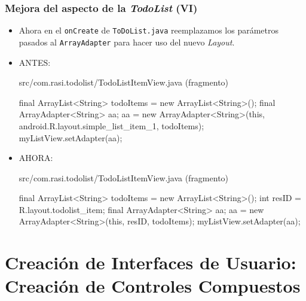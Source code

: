 \documentclass[hyperref={pdfpagelabels=true},ucs]{beamer}
\begin{document}
\begin{frame}[fragile]
\frametitle{Mejora del aspecto de la \emph{TodoList} (VI)}

\begin{itemize}
\item Ahora en el \verb|onCreate| de \verb|ToDoList.java|
  reemplazamos los parámetros pasados al \verb|ArrayAdapter| para
  hacer uso del nuevo \emph{Layout}.
\item ANTES:
\begin{tiny}
\begin{block}{src/com.rasi.todolist/TodoListItemView.java (fragmento)}
\begin{java}
  final ArrayList<String> todoItems = new ArrayList<String>();
  final ArrayAdapter<String> aa;
  aa = new ArrayAdapter<String>(this,
    android.R.layout.simple_list_item_1, todoItems);
  myListView.setAdapter(aa);
\end{java}
\end{block}
\end{tiny}

\item \alert{AHORA}:
\begin{tiny}
\begin{block}{src/com.rasi.todolist/TodoListItemView.java (fragmento)}
\begin{java}
  final ArrayList<String> todoItems = new ArrayList<String>();
  int resID = R.layout.todolist_item;
  final ArrayAdapter<String> aa;
  aa = new ArrayAdapter<String>(this, resID, todoItems);
  myListView.setAdapter(aa);
\end{java}
\end{block}
\end{tiny}

\end{itemize}


\end{frame}

\section[Creación de IU: Creación de Controles Compuestos]{Creación de Interfaces de Usuario: Creación de Controles Compuestos}
\end{document}
